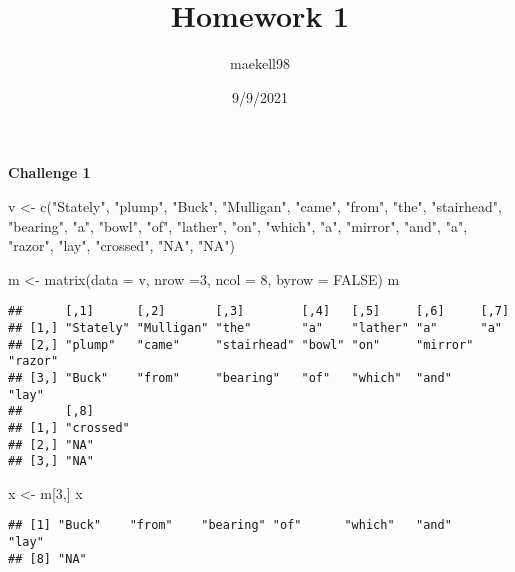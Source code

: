 \documentclass[
]{article}
\title{Homework 1}
\author{maekell98}
\date{9/9/2021}
\newenvironment{Shaded}{\begin{snugshade}}{\end{snugshade}}
\newcommand{\AttributeTok}[1]{\textcolor[rgb]{0.77,0.63,0.00}{#1}}
\newcommand{\ConstantTok}[1]{\textcolor[rgb]{0.00,0.00,0.00}{#1}}
\newcommand{\DecValTok}[1]{\textcolor[rgb]{0.00,0.00,0.81}{#1}}
\newcommand{\FunctionTok}[1]{\textcolor[rgb]{0.00,0.00,0.00}{#1}}
\newcommand{\NormalTok}[1]{#1}
\newcommand{\OtherTok}[1]{\textcolor[rgb]{0.56,0.35,0.01}{#1}}
\newcommand{\StringTok}[1]{\textcolor[rgb]{0.31,0.60,0.02}{#1}}
\begin{document}
\maketitle

\textbf{Challenge 1}

\begin{Shaded}
\begin{Highlighting}[]
\NormalTok{v }\OtherTok{\textless{}{-}} \FunctionTok{c}\NormalTok{(}\StringTok{"Stately"}\NormalTok{, }\StringTok{"plump"}\NormalTok{, }\StringTok{"Buck"}\NormalTok{, }\StringTok{"Mulligan"}\NormalTok{, }\StringTok{"came"}\NormalTok{, }\StringTok{"from"}\NormalTok{, }\StringTok{"the"}\NormalTok{, }\StringTok{"stairhead"}\NormalTok{, }\StringTok{"bearing"}\NormalTok{, }\StringTok{"a"}\NormalTok{, }\StringTok{"bowl"}\NormalTok{, }\StringTok{"of"}\NormalTok{, }\StringTok{"lather"}\NormalTok{, }\StringTok{"on"}\NormalTok{, }\StringTok{"which"}\NormalTok{, }\StringTok{"a"}\NormalTok{, }\StringTok{"mirror"}\NormalTok{, }\StringTok{"and"}\NormalTok{, }\StringTok{"a"}\NormalTok{, }\StringTok{"razor"}\NormalTok{, }\StringTok{"lay"}\NormalTok{, }\StringTok{"crossed"}\NormalTok{, }\StringTok{"NA"}\NormalTok{, }\StringTok{"NA"}\NormalTok{)}

\NormalTok{m }\OtherTok{\textless{}{-}} \FunctionTok{matrix}\NormalTok{(}\AttributeTok{data =}\NormalTok{ v, }\AttributeTok{nrow =}\DecValTok{3}\NormalTok{, }\AttributeTok{ncol =} \DecValTok{8}\NormalTok{, }\AttributeTok{byrow =} \ConstantTok{FALSE}\NormalTok{)}
\NormalTok{m}
\end{Highlighting}
\end{Shaded}

\begin{verbatim}
##      [,1]      [,2]       [,3]        [,4]   [,5]     [,6]     [,7]   
## [1,] "Stately" "Mulligan" "the"       "a"    "lather" "a"      "a"    
## [2,] "plump"   "came"     "stairhead" "bowl" "on"     "mirror" "razor"
## [3,] "Buck"    "from"     "bearing"   "of"   "which"  "and"    "lay"  
##      [,8]     
## [1,] "crossed"
## [2,] "NA"     
## [3,] "NA"
\end{verbatim}

\begin{Shaded}
\begin{Highlighting}[]
\NormalTok{x }\OtherTok{\textless{}{-}}\NormalTok{ m[}\DecValTok{3}\NormalTok{,]}
\NormalTok{x}
\end{Highlighting}
\end{Shaded}

\begin{verbatim}
## [1] "Buck"    "from"    "bearing" "of"      "which"   "and"     "lay"    
## [8] "NA"
\end{verbatim}
\end{document}
